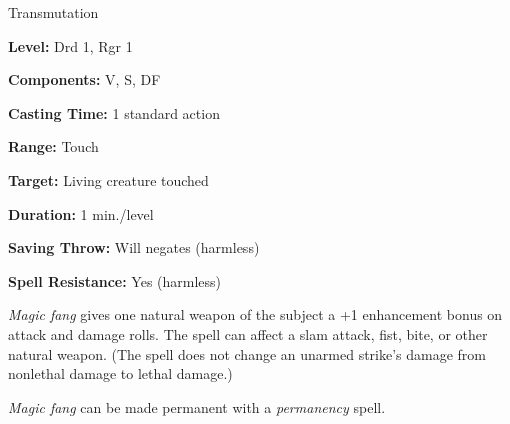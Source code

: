 
Transmutation

\textbf{Level:} Drd 1, Rgr 1

\textbf{Components:} V, S, DF

\textbf{Casting Time:} 1 standard action

\textbf{Range:} Touch

\textbf{Target:} Living creature touched

\textbf{Duration:} 1 min./level

\textbf{Saving Throw:} Will negates (harmless)

\textbf{Spell Resistance:} Yes (harmless)

\textit{Magic fang} gives one natural weapon of the subject a +1 enhancement bonus 
on attack and damage rolls. The spell can affect a slam attack, fist, bite, or 
other natural weapon. (The spell does not change an unarmed strike's damage from 
nonlethal damage to lethal damage.)

\textit{Magic fang} can be made permanent with a \textit{permanency} spell.

